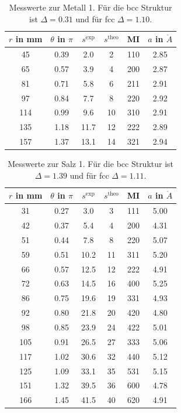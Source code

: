 \begin{table}[H]
 \begin{tabular}{cccccc}
$r$ in mm&	$\theta$ in $\pi$& $s^\text{exp}$& $s^\text{theo}$ & MI &$a$ in $\mathring{A}$\\
\hline
45&	0.39&	2.0&	2&	110&	2.85 \\
65&	0.57&	3.9&	4&	200&	2.87\\
81&	0.71&	5.8&	6&	211&	2.91\\
97&	0.84&	7.7&	8&	220&	2.92\\
114&	0.99&	9.6&	10&	310&	2.91\\
135&	1.18&	11.7&	12&	222&	2.89\\
157&	1.37&	13.1&	14&	321&	2.94
 \end{tabular}
 \caption{Messwerte zur Metall 1. Für die bcc Struktur ist $\Delta=0.31$ und für fcc $\Delta=1.10$.}
 \label{tab:messreihe1}
\end{table}

\begin{table}[H]
 \begin{tabular}{cccccc}
$r$ in mm&	$\theta$ in $\pi$& $s^\text{exp}$& $s^\text{theo}$ & MI &$a$ in $\mathring{A}$\\
\hline
31&	0.27&	3.0&	3&	111&	5.00 \\
42&	0.37&	5.4&	4&	200&	4.31\\
51&	0.44&	7.8&	8&	220&	5.07\\
59&	0.51&	10.2&	11&	311&	5.20\\
66&	0.57&	12.5&	12&	222&	4.91\\
72&	0.63&	14.5&	16&	400&	5.25\\
86&	0.75&	19.6&	19&	331&	4.93\\
92&	0.80&	21.8&	20&	420&	4.80\\
98&	0.85&	23.9&	24&	422&	5.01\\
105&	0.91&	26.5&	27&	333&	5.06\\
117&	1.02&	30.6&	32&	440&	5.12\\
125&	1.09&	33.1&	35&	531&	5.15\\
151&	1.32&	39.5&	36&	600&	4.78\\
166&	1.45&	41.5&	40&	620&	4.91
 \end{tabular}
 \caption{Messwerte zur Salz 1. Für die bcc Struktur ist $\Delta=1.39$ und für fcc $\Delta=1.11$.}
 \label{tab:messreihe2}
\end{table}

